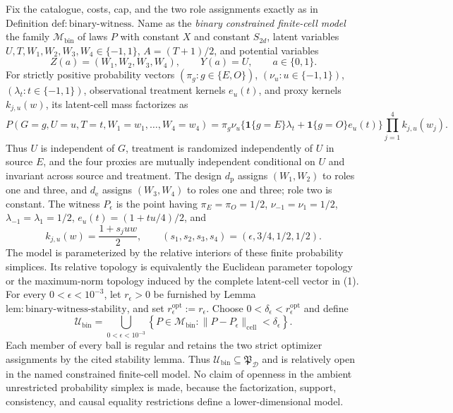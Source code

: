 Fix the catalogue, costs, cap, and the two role assignments exactly as in Definition \(\mathrm{def{:}binary\text{-}witness}\). Name as the \emph{binary constrained finite-cell model} the family \(\mathcal M_{\mathrm{bin}}\) of laws \(P\) with constant \(X\) and constant \(S_{2d}\), latent variables \(U,T,W_1,W_2,W_3,W_4\in\{-1,1\}\), \(A=(T+1)/2\), and potential variables
\[
Z(a)=(W_1,W_2,W_3,W_4),\qquad Y(a)=U,\qquad a\in\{0,1\}.
\]
For strictly positive probability vectors \((\pi_g:g\in\{E,O\})\), \((\nu_u:u\in\{-1,1\})\), \((\lambda_t:t\in\{-1,1\})\), observational treatment kernels \(e_u(t)\), and proxy kernels \(k_{j,u}(w)\), its latent-cell mass factorizes as
\[
P(G=g,U=u,T=t,W_1=w_1,\ldots,W_4=w_4)
=\pi_g\nu_u\bigl\{\mathbf 1\{g=E\}\lambda_t+\mathbf 1\{g=O\}e_u(t)\bigr\}
\prod_{j=1}^4k_{j,u}(w_j). \tag{1}
\]
Thus \(U\) is independent of \(G\), treatment is randomized independently of \(U\) in source \(E\), and the four proxies are mutually independent conditional on \(U\) and invariant across source and treatment. The design \(d_{\mathrm p}\) assigns \((W_1,W_2)\) to roles one and three, and \(d_{\mathrm e}\) assigns \((W_3,W_4)\) to roles one and three; role two is constant. The witness \(P_\epsilon\) is the point having \(\pi_E=\pi_O=1/2\), \(\nu_{-1}=\nu_1=1/2\), \(\lambda_{-1}=\lambda_1=1/2\), \(e_u(t)=(1+tu/4)/2\), and
\[
k_{j,u}(w)=\frac{1+s_juw}{2},
\qquad(s_1,s_2,s_3,s_4)=(\epsilon,3/4,1/2,1/2).
\]
The model is parameterized by the relative interiors of these finite probability simplices. Its relative topology is equivalently the Euclidean parameter topology or the maximum-norm topology induced by the complete latent-cell vector in (1). For every \(0<\epsilon<10^{-3}\), let \(r_\epsilon>0\) be furnished by Lemma \(\mathrm{lem{:}binary\text{-}witness\text{-}stability}\), and set \(r_\epsilon^{\mathrm{opt}}:=r_\epsilon\). Choose \(0<\delta_\epsilon<r_\epsilon^{\mathrm{opt}}\) and define
\[
\mathcal U_{\mathrm{bin}}=\bigcup_{0<\epsilon<10^{-3}}
\left\{P\in\mathcal M_{\mathrm{bin}}:
\|P-P_\epsilon\|_{\mathrm{cell}}<\delta_\epsilon\right\}. \tag{2}
\]
Each member of every ball is regular and retains the two strict optimizer assignments by the cited stability lemma. Thus \(\mathcal U_{\mathrm{bin}}\subseteq\mathfrak P_{\mathcal D}\) and is relatively open in the named constrained finite-cell model. No claim of openness in the ambient unrestricted probability simplex is made, because the factorization, support, consistency, and causal equality restrictions define a lower-dimensional model.